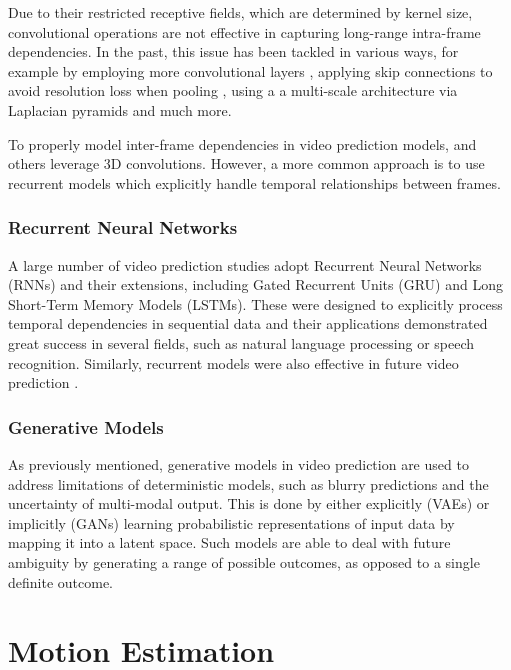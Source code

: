 \documentclass{l4proj}
\begin{document}
Due to their restricted receptive fields, which are determined by kernel size, convolutional operations are not effective in capturing long-range intra-frame dependencies. In the past, this issue has been tackled in various ways, for example by employing more convolutional layers \citep{Jain07}, applying skip connections to avoid resolution loss when pooling \citep{DBLP:journals/corr/RonnebergerFB15}, using a a multi-scale architecture via Laplacian pyramids \citep{DBLP:journals/corr/DentonCSF15, Mathieu15} and much more.

To properly model inter-frame dependencies in video prediction models, \cite{DBLP:journals/corr/abs-1810-01325} and others \citep{DBLP:journals/corr/VondrickPT16, DBLP:journals/corr/abs-1904-10666} leverage 3D convolutions. However, a more common approach is to use  recurrent models which explicitly handle temporal relationships between frames.

\subsubsection{Recurrent Neural Networks}

A large number of video prediction studies adopt Recurrent Neural Networks (RNNs) and their extensions, including Gated Recurrent Units (GRU) and Long Short-Term Memory Models (LSTMs). These were designed to explicitly process temporal dependencies in sequential data and their applications demonstrated great success in several fields, such as natural language processing or speech recognition. Similarly, recurrent models were also effective in future video prediction \citep{DBLP:conf/nips/ShiCWYWW15, DBLP:journals/corr/LotterKC16, DBLP:journals/corr/abs-1809-08318}.

\subsubsection{Generative Models}
As previously mentioned, generative models in video prediction are used to address limitations of deterministic models, such as blurry predictions and the uncertainty of multi-modal output. This is done by either explicitly (VAEs) or implicitly (GANs) learning probabilistic representations of input data by mapping it into a latent space. Such models are able to deal with future ambiguity by generating a range of possible outcomes, as opposed to a single definite outcome.

\section{Motion Estimation}
\end{document}
